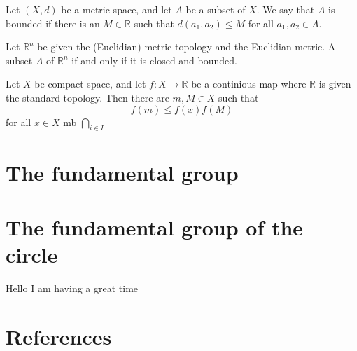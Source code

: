 \documentclass{article}
\theoremstyle{remark}
\begin{document}
\begin{definition}

    Let $\left( X,d \right) $ be a metric space, and let $A$ be a subset of $X$. We say that $A$ is bounded if there is
    an $M  \in  \mathbb{R} $ such that $d\left( a_{1}, a_{2} \right) \le M$ for all $a_{1}, a_{2} \in  A$.

\end{definition}

\begin{theorem}
    Let $\mathbb{R} ^{n}$ be given the (Euclidian) metric topology and the Euclidian metric. A subset $A$ of $\mathbb{R}
    ^{n}$ if and only if it is closed and bounded.

\end{theorem}


\begin{theorem}

    Let $X$ be compact space, and let $f: X \to  \mathbb{R} $ be a continious map where $ \mathbb{R} $ is given the
    standard topology.  Then there are $m, M \in X $ such that \[
    f\left( m \right) \le f\left( x \right) f\left( M \right)
    \]
    for all $x \in   X$
    \textbf{}
    mb
    $\bigcap_{i \in  I}^{} $
\end{theorem}
\section{ The fundamental group}%
\label{sec:the_fundamental_group}




\section{ The fundamental group of the circle}%
\label{sec:the_fundamental_group_of_the_circle}

 Hello I am having a great time \textbf{} \textbf{} \textbf{}



\newpage
\section{References}%
\label{sec:references}



\end{document}
